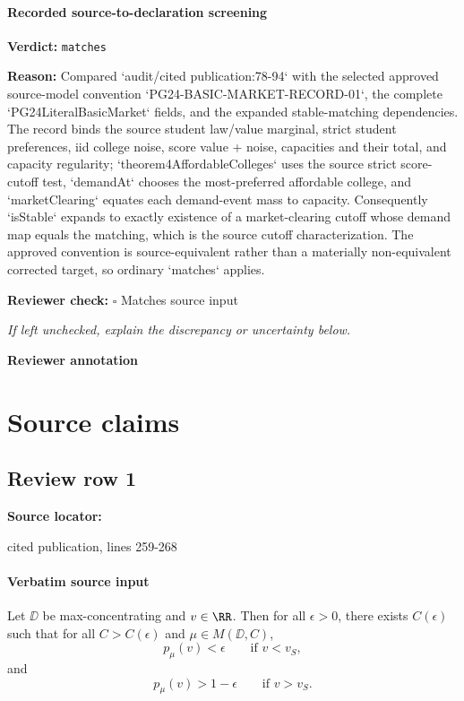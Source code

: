 \documentclass[10pt]{article}
\newcommand{\reviewerbox}{%
  \par\noindent\fbox{\parbox{0.96\linewidth}{\rule{0pt}{0.38in}}}\par
}
\newcommand{\reviewmatch}[1]{%
  \par\noindent\textbf{Reviewer check:} $\square$\; #1\par
  \noindent\emph{If left unchecked, explain the discrepancy or uncertainty below.}\par
}
\begin{document}
\paragraph{Recorded source-to-declaration screening}
\textbf{Verdict:} \texttt{matches}
\\
{\raggedright
\textbf{Reason:} Compared `audit/\allowbreak{}cited publication:\allowbreak{}78-\allowbreak{}94` with the selected approved source-\allowbreak{}model convention `PG24-\allowbreak{}BASIC-\allowbreak{}MARKET-\allowbreak{}RECORD-\allowbreak{}01`, the complete `PG24LiteralBasicMarket` fields, and the expanded stable-\allowbreak{}matching dependencies.\allowbreak{} The record binds the source student law/\allowbreak{}value marginal, strict student preferences, iid college noise, score value + noise, capacities and their total, and capacity regularity;\allowbreak{} `theorem4AffordableColleges` uses the source strict score-\allowbreak{}cutoff test, `demandAt` chooses the most-\allowbreak{}preferred affordable college, and `marketClearing` equates each demand-\allowbreak{}event mass to capacity.\allowbreak{} Consequently `isStable` expands to exactly existence of a market-\allowbreak{}clearing cutoff whose demand map equals the matching, which is the source cutoff characterization.\allowbreak{} The approved convention is source-\allowbreak{}equivalent rather than a materially non-\allowbreak{}equivalent corrected target, so ordinary `matches` applies.\allowbreak{}
\par}
\reviewmatch{Matches source input}
\noindent\textbf{Reviewer annotation}\par
\reviewerbox

\clearpage
\hypertarget{source-claim-4ecaf547b8a4bff9}{}
\hypertarget{source-section-f10b5f68e4acf3dc}{}
\section*{Source claims}
\subsection*{Review row 1}
\textbf{Source locator:} {\footnotesize\raggedright cited publication, lines 259-\allowbreak{}268\par}
\paragraph{Verbatim source input}
\begin{ReviewVerbatim}
\begin{theorem}[Attenuation]\label{thm:attenuating}
    Let $\DD$ be max-concentrating and $v\in \RR$. Then for all $\epsilon > 0$, there exists $C(\epsilon)$ such that for all $C > C(\epsilon)$ and $\mu\in M(\DD, C)$,
    \begin{equation}
        p_\mu(v) < \epsilon \qquad \text{if $v < v_S$},
    \end{equation}
    and
    \begin{equation}
        p_\mu(v) > 1 - \epsilon \qquad \text{if $v > v_S$}.
    \end{equation}
\end{theorem}
\end{ReviewVerbatim}
\end{document}
